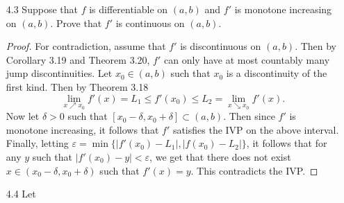 \documentclass[12pt]{article}
\theoremstyle{definition}
\newcommand{\abs}[1]{\lvert #1 \rvert}
\newcommand{\bigabs}[1]{\Bigl \lvert #1 \Bigr \rvert}
\begin{document}
\begin{enumerate}
\begin{proof}
\begin{equation*}
\begin{split}
                        \end{split}
                    \end{equation*}
                Now if we select $\varepsilon_1, \varepsilon_2$ such that
                $\varepsilon_1+\abs{L_1}\delta\leq\varepsilon_2\delta$, then it
                follows that (2) holds iff
                $\abs{f(x)-f(x_0)-L_2(x-x_0)}<\varepsilon\delta$. And by the
                Triangle Inequality we get that
                $\abs{f(x)-f(x_0)-L_2(x-x_0)}<\varepsilon_1+\abs{L_2}\delta$.
                Finally, if $\varepsilon=\varepsilon_2+\abs{L_2}-\abs{L_1}$,
                then 
                    \begin{equation*}
                        \bigabs{\frac{f(x)-f(x_0)}{x-x_0}-L_2}<\varepsilon.
                    \end{equation*}
                Therefore the limit exists and $f$ is differentiable at $x_0$.
            \end{proof}
        \item[4.3] Suppose that $f$ is differentiable on $(a, b)$ and $f'$ is
            monotone increasing on $(a, b)$. Prove that $f'$ is continuous on
            $(a, b)$.
            \begin{proof}
                For contradiction, assume that $f'$ is discontinuous on $(a,
                b)$. Then by Corollary 3.19 and Theorem 3.20, $f'$ can only
                have at most countably many jump discontinuities. Let
                $x_0\in(a, b)$ such that $x_0$ is a discontinuity of the first
                kind. Then by Theorem 3.18 
                    \begin{equation*}
                        \lim_{x\nearrow x_0}f'(x)=L_1\leq f'(x_0)\leq L_2=
                        \lim_{x\searrow x_0}f'(x).
                    \end{equation*}
                Now let $\delta>0$ such that $[x_0-\delta,
                x_0+\delta]\subset(a, b)$. Then since $f'$ is monotone
                increasing, it follows that $f'$ satisfies the IVP on the above
                interval. Finally, letting
                $\varepsilon=\min\{\abs{f'(x_0)-L_1}, \abs{f(x_0)-L_2}\}$, it
                follows that for any $y$ such that
                $\abs{f'(x_0)-y}<\varepsilon$, we get that there does not exist
                $x\in (x_0-\delta, x_0+\delta)$ such that $f'(x)=y$. This
                contradicts the IVP. 
            \end{proof}
        \item[4.4] Let

\end{enumerate}
\end{document}
